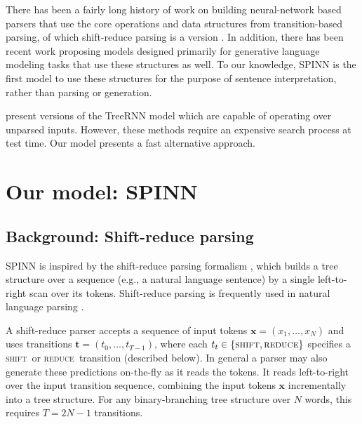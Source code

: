 \documentclass[11pt]{article}
\newcommand{\shift}{\textsc{shift}}
\newcommand{\reduce}{\textsc{reduce}}
\begin{document}
There has been a fairly long history of work on building neural-network based parsers that use the core operations and data structures from transition-based parsing, of which shift-reduce parsing is a version \citep{henderson2004discriminative,emami2005neural,titov2010latent,chen2014,buys2generative,dyer-EtAl:2015:ACL-IJCNLP,kiperwasser2016easy}. In addition, there has been recent work \citep{zhang2016top,dyer2016rnn} proposing models designed primarily for generative language modeling tasks that use these structures as well. To our knowledge, SPINN is the first model to use these structures for the purpose of sentence interpretation, rather than parsing or generation.

\citet{socher2011parsing,socher2011semi} present versions of the TreeRNN model which are capable of operating over unparsed inputs. However, these methods require an expensive search process at test time. Our model presents a fast alternative approach.

\section{Our model: SPINN}

\subsection{Background: Shift-reduce parsing}

SPINN is inspired by the shift-reduce parsing formalism \citep{aho1972theory}, which builds a tree structure over a sequence (e.g., a natural language sentence) by a single left-to-right scan over its tokens. Shift-reduce parsing is frequently used in natural language parsing \citep[e.g.,][]{nivre2003efficient}.

A shift-reduce parser accepts a sequence of input tokens $\mathbf x = (x_1, \dots, x_N)$ and uses transitions $\mathbf t = (t_0, \dots, t_{T-1})$, where each $t_t \in \{\shift, \reduce\}$ specifies a \shift~or \reduce~transition (described below). In general a parser may also generate these predictions on-the-fly as it reads the tokens. It reads left-to-right over the input transition sequence, combining the input tokens $\mathbf x$ incrementally into a tree structure. For any binary-branching tree structure over $N$ words, this requires $T = 2N - 1$ transitions.
\end{document}
